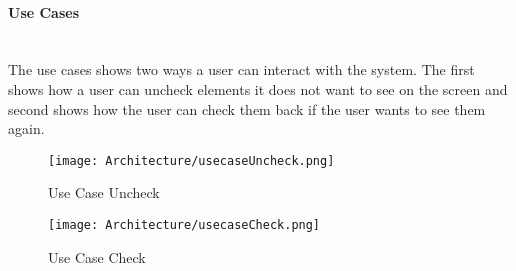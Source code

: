 \documentclass[../document.tex]{subfiles}
\begin{document}
\paragraph{Use Cases} \ \\
The use cases shows two ways a user can interact with the system. The first shows how a user can uncheck elements it does not want to see on the screen and second shows how the user can check them back if the user wants to see them again.

\begin{figure}[H]
	\centering
	\texttt{[image: Architecture/usecaseUncheck.png]}
	\caption{Use Case Uncheck}
\end{figure}

\begin{figure}[H]
	\centering
	\texttt{[image: Architecture/usecaseCheck.png]}
	\caption{Use Case Check}
\end{figure}
\end{document}
